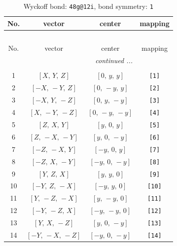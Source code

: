 \documentclass[fleqn,8pt]{jsarticle}
\begin{document}
\begin{longtable}{cccc}
\caption{Wyckoff bond: {\tt 48g@12i}, bond symmetry: {\tt 1}}
 \\
 \hline \hline
No. & vector & center & mapping \\ \hline \endfirsthead

\multicolumn{3}{l}{\tablename\ \thetable{}} \\
 \hline \hline
No. & vector & center & mapping \\ \hline \endhead

 \hline \hline
\multicolumn{3}{r}{\footnotesize\it continued ...} \\ \endfoot

 \hline \hline
\multicolumn{3}{r}{} \\ \endlastfoot

1 & $\left[ X,\, Y,\, Z \right]$ & $\left[ 0,\, y,\, y \right]$ & {\tt [1]} \\ \hline
2 & $\left[ - X,\, - Y,\, Z \right]$ & $\left[ 0,\, - y,\, y \right]$ & {\tt [2]} \\ \hline
3 & $\left[ - X,\, Y,\, - Z \right]$ & $\left[ 0,\, y,\, - y \right]$ & {\tt [3]} \\ \hline
4 & $\left[ X,\, - Y,\, - Z \right]$ & $\left[ 0,\, - y,\, - y \right]$ & {\tt [4]} \\ \hline
5 & $\left[ Z,\, X,\, Y \right]$ & $\left[ y,\, 0,\, y \right]$ & {\tt [5]} \\ \hline
6 & $\left[ Z,\, - X,\, - Y \right]$ & $\left[ y,\, 0,\, - y \right]$ & {\tt [6]} \\ \hline
7 & $\left[ - Z,\, - X,\, Y \right]$ & $\left[ - y,\, 0,\, y \right]$ & {\tt [7]} \\ \hline
8 & $\left[ - Z,\, X,\, - Y \right]$ & $\left[ - y,\, 0,\, - y \right]$ & {\tt [8]} \\ \hline
9 & $\left[ Y,\, Z,\, X \right]$ & $\left[ y,\, y,\, 0 \right]$ & {\tt [9]} \\ \hline
10 & $\left[ - Y,\, Z,\, - X \right]$ & $\left[ - y,\, y,\, 0 \right]$ & {\tt [10]} \\ \hline
11 & $\left[ Y,\, - Z,\, - X \right]$ & $\left[ y,\, - y,\, 0 \right]$ & {\tt [11]} \\ \hline
12 & $\left[ - Y,\, - Z,\, X \right]$ & $\left[ - y,\, - y,\, 0 \right]$ & {\tt [12]} \\ \hline
13 & $\left[ Y,\, X,\, - Z \right]$ & $\left[ y,\, 0,\, - y \right]$ & {\tt [13]} \\ \hline
14 & $\left[ - Y,\, - X,\, - Z \right]$ & $\left[ - y,\, 0,\, - y \right]$ & {\tt [14]} \\ \hline

\end{longtable}
\end{document}
